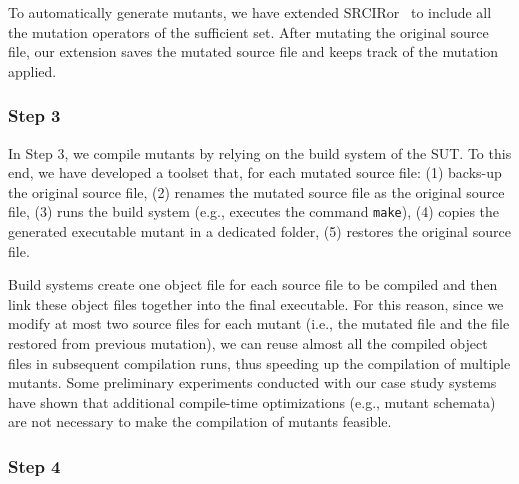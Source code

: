 

To automatically generate mutants, we have extended SRCIRor~\cite{hariri2018srciror} to include all the mutation operators of the sufficient set. After mutating the original source file, our extension saves the mutated source file and keeps track of the mutation applied. 

\subsubsection{Step 3}
\label{codeDriven:stepThree}

In Step 3, we compile mutants by relying on the build system of the SUT. To this end, we have developed a toolset that, for each mutated source file: (1) backs-up the original source file, (2) renames the mutated source file as the original source file, (3) runs the build system (e.g., executes the command \texttt{make}), (4) copies the generated executable mutant in a dedicated folder, (5) restores the original source file. 

Build systems create one object file for each source file to be compiled and then link these object files together into the final executable. For this reason, since we modify at most two source files for each mutant (i.e., the mutated file and the file restored from previous mutation), we can reuse almost all the compiled object files in subsequent compilation runs, thus speeding up the compilation of multiple mutants. Some preliminary experiments conducted with our case study systems have shown that additional compile-time optimizations (e.g., mutant schemata) are not necessary to make the compilation of mutants feasible.


\subsubsection{Step 4}

